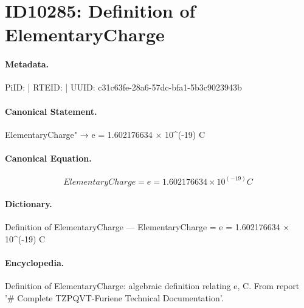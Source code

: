\section*{ID10285: Definition of ElementaryCharge}
\paragraph{Metadata.}
PiID:  | RTEID:  | UUID: c31c63fe-28a6-57dc-bfa1-5b3c9023943b

\paragraph{Canonical Statement.}
ElementaryCharge" → e = 1.602176634 × 10\textasciicircum{}(-19) C

\paragraph{Canonical Equation.}
\[
ElementaryCharge = e = 1.602176634 × 10^(-19) C
\]

\paragraph{Dictionary.}
Definition of ElementaryCharge — ElementaryCharge = e = 1.602176634 × 10\textasciicircum{}(-19) C

\paragraph{Encyclopedia.}
Definition of ElementaryCharge: algebraic definition relating e, C. From report '\# Complete TZPQVT-Furiene Technical Documentation'.
